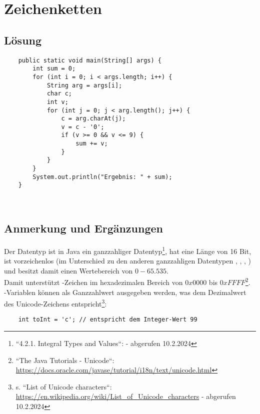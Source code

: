 \chapter{Zeichenketten}

\section{Lösung}

\begin{verbatim}
    public static void main(String[] args) {
        int sum = 0;
        for (int i = 0; i < args.length; i++) {
            String arg = args[i];
            char c;
            int v;
            for (int j = 0; j < arg.length(); j++) {
                c = arg.charAt(j);
                v = c - '0';
                if (v >= 0 && v <= 9) {
                    sum += v;
                }
            }
        }
        System.out.println("Ergebnis: " + sum);
    }
\end{verbatim}\\

\section{Anmerkung und Ergänzungen}

Der Datentyp  ist in Java ein ganzzahliger Datentyp\footnote{
    ``4.2.1. Integral Types and Values``:  - abgerufen 10.2.2024
}, hat eine Länge von 16 Bit, ist vorzeichenlos (im Unterschied zu den anderen ganzzahligen Datentypen , , , ) und besitzt damit einen Wertebereich von $0 - 65.535$.\\
Damit unterstützt  -Zeichen im hexadezimalen Bereich von $0x0000$ bis $0xFFFF$\footnote{
    ``The Java Tutorials - Unicode``: \url{https://docs.oracle.com/javase/tutorial/i18n/text/unicode.html}
}.\\

\noindent
{}-Variablen können als Ganzzahlwert ausgegeben werden, was dem Dezimalwert des Unicode-Zeichens entspricht\footnote{s. ``List of Unicode characters``: \url{https://en.wikipedia.org/wiki/List_of_Unicode_characters} - abgerufen 10.2.2024}:

\begin{verbatim}
    int toInt = 'c'; // entspricht dem Integer-Wert 99
\end{verbatim}

